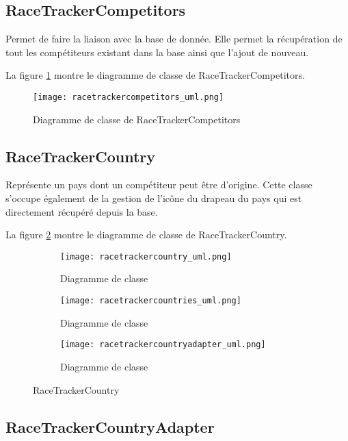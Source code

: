 \subsection{RaceTrackerCompetitors}

Permet de faire la liaison avec la base de donnée. Elle permet la récupération de tout les compétiteurs existant dans la base ainsi que l'ajout de nouveau.

La figure \ref{fig:racetrackercompetitors_uml} montre le diagramme de classe de RaceTrackerCompetitors.

\begin{figure}[htb]
\centering 
\texttt{[image: racetrackercompetitors\_uml.png]} 
\caption{Diagramme de classe de RaceTrackerCompetitors}
\label{fig:racetrackercompetitors_uml}
 \end{figure}

\subsection{RaceTrackerCountry}

Représente un pays dont un compétiteur peut être d'origine. Cette classe s'occupe également de la gestion de l'icône du drapeau du pays qui est directement récupéré depuis la base.

La figure \ref{fig:racetrackercountry_uml} montre le diagramme de classe de RaceTrackerCountry.

\begin{figure}[htb!]
    \centering
    \begin{subfigure}[htb]{1\textwidth}
		\texttt{[image: racetrackercountry\_uml.png]} 
		\caption{Diagramme de classe}
		\label{fig:racetrackercountry_uml}
    \end{subfigure}
    \begin{subfigure}[htb]{1\textwidth}
		\texttt{[image: racetrackercountries\_uml.png]} 
		\caption{Diagramme de classe}
		\label{fig:racetrackercountries_uml}
    \end{subfigure}
    \begin{subfigure}[htb]{1\textwidth}
		\texttt{[image: racetrackercountryadapter\_uml.png]} 
		\caption{Diagramme de classe}
		\label{fig:racetrackercountryadapter_uml}
    \end{subfigure}
    \caption{RaceTrackerCountry}\label{fig:racetrackercountry_fig}
\end{figure}

\subsection{RaceTrackerCountryAdapter}

